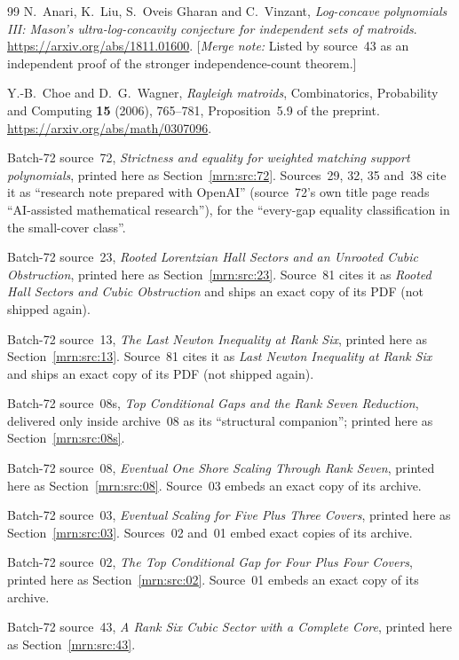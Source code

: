 \documentclass[11pt,a4paper]{article}
\theoremstyle{remark}\newtheorem{remark}[theorem]{Remark}
\newcommand{\mnote}[1]{[\textit{Merge note:} #1]}
\begin{document}
\begin{thebibliography}{99}
N.~Anari, K.~Liu, S.~Oveis Gharan and C.~Vinzant, \emph{Log-concave
polynomials III: Mason's ultra-log-concavity conjecture for independent sets
of matroids}. \url{https://arxiv.org/abs/1811.01600}. \mnote{Listed by
source~43 as an independent proof of the stronger independence-count
theorem.}

Y.-B.~Choe and D.~G.~Wagner, \emph{Rayleigh matroids}, Combinatorics,
Probability and Computing \textbf{15} (2006), 765--781, Proposition~5.9 of the
preprint. \url{https://arxiv.org/abs/math/0307096}.

Batch-72 source~72, \emph{Strictness and equality for weighted matching
support polynomials}, printed here as Section~\ref{mrn:src:72}. Sources~29,
32, 35 and~38 cite it as ``research note prepared with OpenAI'' (source~72's
own title page reads ``AI-assisted mathematical research''), for the
``every-gap equality classification in the small-cover class''.

Batch-72 source~23, \emph{Rooted Lorentzian Hall Sectors and an Unrooted
Cubic Obstruction}, printed here as Section~\ref{mrn:src:23}.
Source~81 cites it as \emph{Rooted Hall Sectors and Cubic Obstruction} and
ships an exact copy of its PDF (not shipped again).

Batch-72 source~13, \emph{The Last Newton Inequality at Rank Six}, printed
here as Section~\ref{mrn:src:13}. Source~81 cites it as \emph{Last Newton
Inequality at Rank Six} and ships an exact copy of its PDF (not shipped
again).

Batch-72 source~08s, \emph{Top Conditional Gaps and the Rank Seven
Reduction}, delivered only inside archive~08 as its ``structural companion'';
printed here as Section~\ref{mrn:src:08s}.

Batch-72 source~08, \emph{Eventual One Shore Scaling Through Rank Seven},
printed here as Section~\ref{mrn:src:08}. Source~03 embeds an exact copy of
its archive.

Batch-72 source~03, \emph{Eventual Scaling for Five Plus Three Covers},
printed here as Section~\ref{mrn:src:03}. Sources~02 and~01 embed exact
copies of its archive.

Batch-72 source~02, \emph{The Top Conditional Gap for Four Plus Four
Covers}, printed here as Section~\ref{mrn:src:02}. Source~01 embeds an exact
copy of its archive.

Batch-72 source~43, \emph{A Rank Six Cubic Sector with a Complete Core},
printed here as Section~\ref{mrn:src:43}.


\end{thebibliography}
\end{document}
